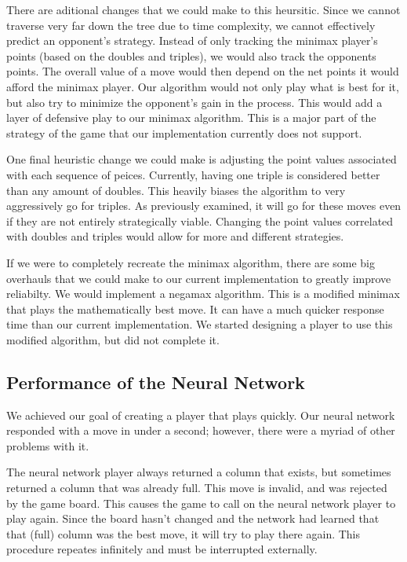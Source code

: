 \documentclass[12pt]{article}
\begin{document}
There are aditional changes that we could make to this heursitic. Since we cannot traverse very far down the tree due to time complexity, we cannot effectively predict an opponent's strategy. Instead of only tracking the minimax player's points (based on the doubles and triples), we would also track the opponents points. The overall value of a move would then depend on the net points it would afford the minimax player. Our algorithm would not only play what is best for it, but also try to minimize the opponent's gain in the process. This would add a layer of defensive play to our minimax algorithm. This is a major part of the strategy of the  game that our implementation currently does not support.

One final heuristic change we could make is adjusting the point values associated with each sequence of peices. Currently, having one triple is considered better than any amount of doubles. This heavily biases the algorithm to very aggressively go for triples. As previously examined, it will go for these moves even if they are not entirely strategically viable. Changing the point values correlated with doubles and triples would allow for more and different strategies.

If we were to completely recreate the minimax algorithm, there are some big overhauls that we could make to our current implementation to greatly improve reliabilty. We would implement a negamax algorithm. This is a modified minimax that plays the mathematically best move. It can have a much quicker response time than our current implementation. We started designing a player to use this modified algorithm, but did not complete it.

\subsection{Performance of the Neural Network}

We achieved our goal of creating a player that plays quickly. Our neural network responded with a move in under a second; however, there were a myriad of other problems with it.

 The neural network player always returned a column that exists, but sometimes returned a column that was already full. This move is invalid, and was rejected by the game board. This causes the game to call on the neural network player to play again. Since the board hasn't changed and the network had learned that that (full) column was the best move, it will try to play there again. This procedure repeates infinitely and must be interrupted externally.
\end{document}
